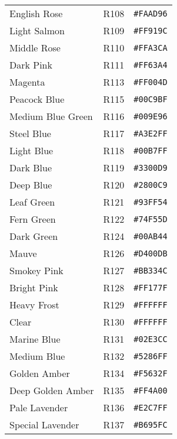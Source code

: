\documentclass[a4paper]{article}
\begin{document}
\begin{longtable}{|l|l|r|}
English Rose & R108 & \texttt{\#FAAD96} \cellcolor[HTML]{FAAD96} \\
Light Salmon & R109 & \texttt{\#FF919C} \cellcolor[HTML]{FF919C} \\
Middle Rose & R110 & \texttt{\#FFA3CA} \cellcolor[HTML]{FFA3CA} \\
Dark Pink & R111 & \texttt{\#FF63A4} \cellcolor[HTML]{FF63A4} \\
Magenta & R113 & \texttt{\#FF004D} \cellcolor[HTML]{FF004D} \\
Peacock Blue & R115 & \texttt{\#00C9BF} \cellcolor[HTML]{00C9BF} \\
Medium Blue Green & R116 & \texttt{\#009E96} \cellcolor[HTML]{009E96} \\
Steel Blue & R117 & \texttt{\#A3E2FF} \cellcolor[HTML]{A3E2FF} \\
Light Blue & R118 & \texttt{\#00B7FF} \cellcolor[HTML]{00B7FF} \\
Dark Blue & R119 & \texttt{\#3300D9} \cellcolor[HTML]{3300D9} \\
Deep Blue & R120 & \texttt{\#2800C9} \cellcolor[HTML]{2800C9} \\
Leaf Green & R121 & \texttt{\#93FF54} \cellcolor[HTML]{93FF54} \\
Fern Green & R122 & \texttt{\#74F55D} \cellcolor[HTML]{74F55D} \\
Dark Green & R124 & \texttt{\#00AB44} \cellcolor[HTML]{00AB44} \\
Mauve & R126 & \texttt{\#D400DB} \cellcolor[HTML]{D400DB} \\
Smokey Pink & R127 & \texttt{\#BB334C} \cellcolor[HTML]{BB334C} \\
Bright Pink & R128 & \texttt{\#FF177F} \cellcolor[HTML]{FF177F} \\
Heavy Frost & R129 & \texttt{\#FFFFFF} \cellcolor[HTML]{FFFFFF} \\
Clear & R130 & \texttt{\#FFFFFF} \cellcolor[HTML]{FFFFFF} \\
Marine Blue & R131 & \texttt{\#02E3CC} \cellcolor[HTML]{02E3CC} \\
Medium Blue & R132 & \texttt{\#5286FF} \cellcolor[HTML]{5286FF} \\
Golden Amber & R134 & \texttt{\#F5632F} \cellcolor[HTML]{F5632F} \\
Deep Golden Amber & R135 & \texttt{\#FF4A00} \cellcolor[HTML]{FF4A00} \\
Pale Lavender & R136 & \texttt{\#E2C7FF} \cellcolor[HTML]{E2C7FF} \\
Special Lavender & R137 & \texttt{\#B695FC} \cellcolor[HTML]{B695FC} \\

\end{longtable}
\end{document}
